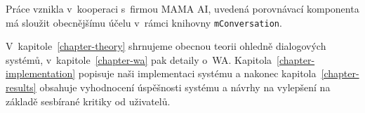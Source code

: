 Práce vznikla v~kooperaci s~firmou MAMA AI, uvedená porovnávací komponenta má
sloužit obecnějšímu účelu v~rámci kni\-ho\-vny \texttt{mConversation}.

V~kapitole~\ref{chapter-theory} shrnujeme obecnou teorii ohledně dialogových
systémů, v~kapitole~\ref{chapter-wa} pak detaily o~WA. Kapitola~\ref{chapter-implementation}
popisuje naši implementaci systému a nakonec kapitola~\ref{chapter-results}
obsahuje vyhodnocení úspěšnosti systému a návrhy na vylepšení
na základě sesbírané kritiky od uživatelů.